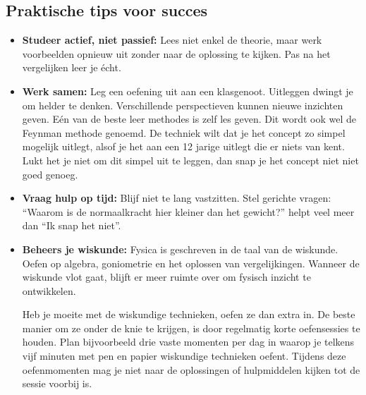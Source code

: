 \documentclass{ximera}
\begin{document}

 \subsection{Praktische tips voor succes}
  

\begin{itemize}
  \item \textbf{Studeer actief, niet passief:}  
  Lees niet enkel de theorie, maar werk voorbeelden opnieuw uit zonder naar de oplossing te kijken.  
  Pas na het vergelijken leer je écht.

  \item \textbf{Werk samen:}  
  Leg een oefening uit aan een klasgenoot. Uitleggen dwingt je om helder te denken.  
  Verschillende perspectieven kunnen nieuwe inzichten geven. Eén van de beste leer methodes is zelf les geven. Dit wordt ook wel de Feynman methode genoemd. De techniek wilt dat je het concept zo simpel mogelijk uitlegt, alsof je het aan een 12 jarige uitlegt die er niets van kent. Lukt het je niet om dit simpel uit te leggen, dan snap je het concept niet niet goed genoeg.

 
  \item \textbf{Vraag hulp op tijd:}  
  Blijf niet te lang vastzitten. Stel gerichte vragen:  
  “Waarom is de normaalkracht hier kleiner dan het gewicht?” helpt veel meer dan “Ik snap het niet”.

  \item \textbf{Beheers je wiskunde:}  
Fysica is geschreven in de taal van de wiskunde.
Oefen op algebra, goniometrie en het oplossen van vergelijkingen.
Wanneer de wiskunde vlot gaat, blijft er meer ruimte over om fysisch inzicht te ontwikkelen.

Heb je moeite met de wiskundige technieken, oefen ze dan extra in.
De beste manier om ze onder de knie te krijgen, is door regelmatig korte oefensessies te houden.
Plan bijvoorbeeld drie vaste momenten per dag in waarop je telkens vijf minuten met pen en papier wiskundige technieken oefent.
Tijdens deze oefenmomenten mag je niet naar de oplossingen of hulpmiddelen kijken tot de sessie voorbij is.


\end{itemize}
\end{document}
